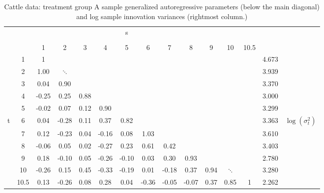 \documentclass[12pt]{article}
\theoremstyle{definition}
\begin{document}
\begin{table}[ht] \label{table:sample-regressogram-garps}
\begin{center}
\begin{tabular}{lc|ccccccccccc|cr}
& \multicolumn{11}{c}{s}\\
&&&&&&&&&&&&\\
& & 1 & 2 & 3 & 4 & 5 & 6 & 7 & 8 & 9 & 10 & 10.5 & \\ 
  \hline
&1 & 1 & &&&&&&&&& & 4.673& \\ 
&  2 & 1.00 & $\ddots$&&&&&&&&&& 3.939 &\\ 
&  3 & 0.04 & 0.90 &  &&&&&&&&& 3.370&\\ 
&  4 & -0.25 & 0.25 & 0.88 &  &&&&&&&&3.000& \\ 
&  5 & -0.02 & 0.07 & 0.12 & 0.90 & &&&&&&& 3.299&\\ 
t &  6 & 0.04 & -0.28 & 0.11 & 0.37 & 0.82  &&&&&&& 3.363 & $\log\left(\sigma^2_t\right)$\\ 
 & 7 & 0.12 & -0.23 & 0.04 & -0.16 & 0.08 & 1.03  &&&&&& 3.610\\ 
 & 8 & -0.06 & 0.05 & 0.02 & -0.27 & 0.23 & 0.61 & 0.42 &&&&& 3.403&\\ 
 & 9 & 0.18 & -0.10 & 0.05 & -0.26 & -0.10 & 0.03 & 0.30 & 0.93&&&& 2.780&  \\ 
 & 10 & -0.26 & 0.15 & 0.45 & -0.33 & -0.19 & 0.01 & -0.18 & 0.37 & 0.94 & $\ddots$&&3.280& \\ 
 & 10.5 & 0.13 & -0.26 & 0.08 & 0.28 & 0.04 & -0.36 & -0.05 & -0.07 & 0.37 & 0.85 & 1  &2.262&\\ 
\end{tabular}
\caption{Cattle data: treatment group A sample generalized autoregressive parameters (below the main diagonal) and log sample innovation variances (rightmost column.)}
\end{center}
\end{table}
\end{document}
